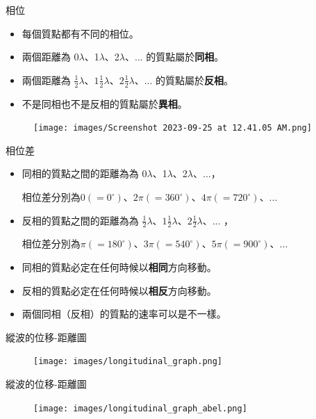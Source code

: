\documentclass[13pt]{beamer}
\begin{document}
\begin{frame}{相位}
    \begin{itemize}
        \item 每個質點都有不同的相位。
        \item 兩個距離為 0$\lambda$、1$\lambda$、2$\lambda$、... 的質點屬於\textbf{同相}。
        \item 兩個距離為 $\frac{1}{2}\lambda$、$1\frac{1}{2}\lambda$、$2\frac{1}{2}\lambda$、... 的質點屬於\textbf{反相}。
        \item 不是同相也不是反相的質點屬於\textbf{異相}。
    \end{itemize}
    \begin{figure}
        \centering
        \texttt{[image: images/Screenshot 2023-09-25 at 12.41.05 AM.png]}


    \end{figure}
\end{frame}
\begin{frame}{相位差}
    \begin{itemize}
        \item 同相的質點之間的距離為為 0$\lambda$、1$\lambda$、2$\lambda$、...，\par 相位差分別為$0(=0^\circ)$、$2\pi(=360^\circ)$、$4\pi(=720^\circ)$、...
        \item 反相的質點之間的距離為為 $\frac{1}{2}\lambda$、$1\frac{1}{2}\lambda$、$2\frac{1}{2}\lambda$、... ，\par 相位差分別為$\pi(=180^\circ)$、$3\pi(=540^\circ)$、$5\pi(=900^\circ)$、...
        \item 同相的質點必定在任何時候以\textbf{相同}方向移動。
        \item 反相的質點必定在任何時候以\textbf{相反}方向移動。
        \item 兩個同相（反相）的質點的速率可以是不一樣。

    \end{itemize}
\end{frame}

\begin{frame}{縱波的位移-距離圖}
    \begin{figure}
        \centering
        \texttt{[image: images/longitudinal\_graph.png]}


    \end{figure}
\end{frame}
\begin{frame}{縱波的位移-距離圖}
    \begin{figure}
        \centering
        \texttt{[image: images/longitudinal\_graph\_abel.png]}


    \end{figure}
\end{frame}
\end{document}
